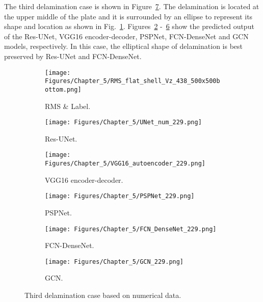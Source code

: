 
The third delamination case is shown in Figure~\ref{fig:rms_third_case}. 
The delamination is located at the upper middle of the plate and it is surrounded by an ellipse to represent its shape and location as shown in Fig.~\ref{fig:RMS_bottom_438}.
Figures~\ref{fig:unet_229} -~\ref{fig:gcn_229} show the predicted output of the Res-UNet, VGG16 encoder-decoder, PSPNet, FCN-DenseNet and GCN models, respectively. 
In this case, the elliptical shape of delamination is best preserved by Res-UNet and FCN-DenseNet. 
\begin{figure} [!h]
	\centering
	\begin{subfigure}[b]{.48\textwidth}
		\centering
		\texttt{[image: Figures/Chapter\_5/RMS\_flat\_shell\_Vz\_438\_500x500bottom.png]}
		\caption{RMS \& Label.}
		\label{fig:RMS_bottom_438}
	\end{subfigure}
	\hfill
	\begin{subfigure}[b]{.48\textwidth}
		\centering
		\texttt{[image: Figures/Chapter\_5/UNet\_num\_229.png]}
		\caption{Res-UNet.}
		\label{fig:unet_229}	
	\end{subfigure}
	\hfill
	\begin{subfigure}[b]{.48\textwidth}
		\centering
		\texttt{[image: Figures/Chapter\_5/VGG16\_autoencoder\_229.png]}
		\caption{VGG16 encoder-decoder.}
		\label{fig:vgg16_229}
	\end{subfigure}
	\hfill
	\begin{subfigure}[b]{.48\textwidth}
		\centering
		\texttt{[image: Figures/Chapter\_5/PSPNet\_229.png]}
		\caption{PSPNet.}
		\label{fig:pspnet_229}	
	\end{subfigure}
	\hfill
	\begin{subfigure}[b]{.48\textwidth}
		\centering
		\texttt{[image: Figures/Chapter\_5/FCN\_DenseNet\_229.png]}
		\caption{FCN-DenseNet.}
		\label{fig:densenet_229}
	\end{subfigure}
	\hfill
	\begin{subfigure}[b]{.48\textwidth}
		\centering
		\texttt{[image: Figures/Chapter\_5/GCN\_229.png]}
		\caption{GCN.}
		\label{fig:gcn_229}	
	\end{subfigure}
	\caption{Third delamination case based on numerical data.}
	\label{fig:rms_third_case}
\end{figure}


